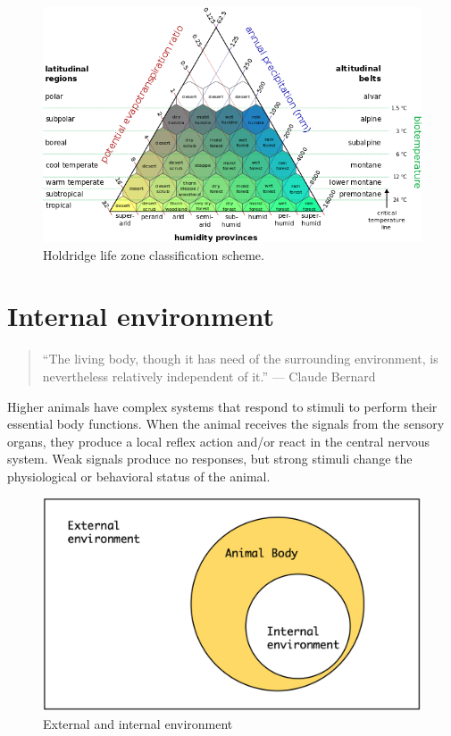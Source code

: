 \documentclass[]{book}
\begin{document}
\begin{figure}

{\centering \includegraphics[width=1\linewidth]{figures/lifezones} 

}

\caption{Holdridge life zone classification scheme.}\label{fig:holdridge}
\end{figure}

\section{Internal environment}\label{internal-environment}

\begin{quote}
``The living body, though it has need of the surrounding environment, is
nevertheless relatively independent of it.'' --- Claude Bernard
\end{quote}

Higher animals have complex systems that respond to stimuli to perform
their essential body functions. When the animal receives the signals
from the sensory organs, they produce a local reflex action and/or react
in the central nervous system. Weak signals produce no responses, but
strong stimuli change the physiological or behavioral status of the
animal.

\begin{figure}

{\centering \includegraphics[width=0.6\linewidth]{figures/animal-env} 

}

\caption{External and internal environment}\label{fig:ext-int-env}
\end{figure}
\end{document}
